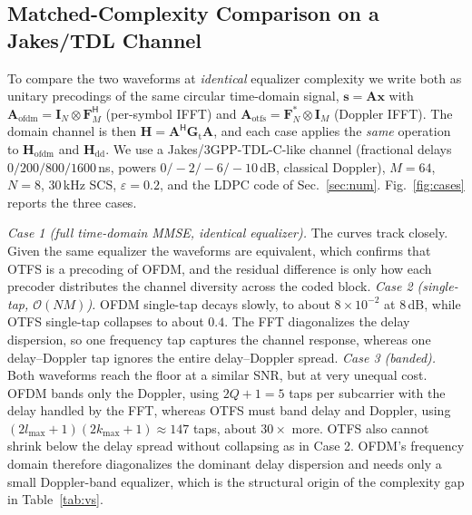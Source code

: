 \documentclass[onecolumn,journal]{IEEEtran}
\theoremstyle{bfhead}
\newcommand{\bF}{\bm{F}}
\newcommand{\bI}{\bm{I}}
\newcommand{\bG}{\bm{G}}
\begin{document}
\subsection{Matched-Complexity Comparison on a Jakes/TDL Channel}
\label{sec:cases}
To compare the two waveforms at \emph{identical} equalizer complexity we write
both as unitary precodings of the same circular time-domain signal,
$\bm{s}=\bm{A}\bm{x}$ with $\bm{A}_{\mathrm{ofdm}}=\bI_N\otimes\bF_M^{\mathsf H}$
(per-symbol IFFT) and $\bm{A}_{\mathrm{otfs}}=\bF_N^{*}\otimes\bI_M$
(Doppler IFFT). The domain channel is then $\bm{H}=\bm{A}^{\mathsf H}
\bG_{\mathrm t}\bm{A}$, and each case applies the \emph{same} operation to
$\bm{H}_{\mathrm{ofdm}}$ and $\bm{H}_{\mathrm{dd}}$. We use a
Jakes/3GPP-TDL-C-like channel (fractional delays $0/200/800/1600$\,ns, powers
$0/{-}2/{-}6/{-}10$\,dB, classical Doppler), $M{=}64$, $N{=}8$, $30$\,kHz SCS,
$\varepsilon{=}0.2$, and the LDPC code of Sec.~\ref{sec:num}. Fig.~\ref{fig:cases}
reports the three cases.

\emph{Case 1 (full time-domain MMSE, identical equalizer).} The curves track
closely. Given the same equalizer the waveforms are equivalent, which confirms
that OTFS is a precoding of OFDM, and the residual difference is only how each
precoder distributes the channel diversity across the coded block.
\emph{Case 2 (single-tap, $\mathcal O(NM)$).}
OFDM single-tap decays slowly, to about $8\times10^{-2}$ at $8$\,dB, while OTFS
single-tap collapses to about $0.4$. The FFT
diagonalizes the delay dispersion, so one frequency tap captures the channel
response, whereas one delay--Doppler tap ignores the entire delay--Doppler
spread. \emph{Case 3 (banded).} Both waveforms reach the floor at a similar SNR,
but at very unequal cost. OFDM bands only the Doppler, using $2Q{+}1{=}5$ taps per
subcarrier with the delay handled by the FFT, whereas OTFS must band delay and
Doppler, using $(2l_{\max}{+}1)(2k_{\max}{+}1)\approx147$ taps, about $30\times$
more. OTFS also cannot shrink below the delay spread without collapsing as in
Case 2. OFDM's frequency domain therefore diagonalizes the dominant delay
dispersion and needs only a small Doppler-band equalizer, which is the structural
origin of the complexity gap in Table~\ref{tab:vs}.
\end{document}
